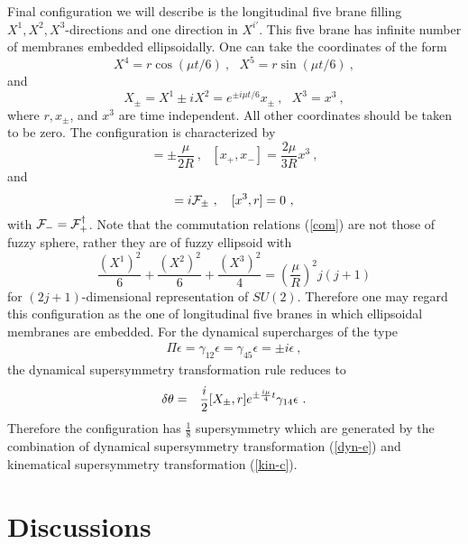 \documentclass[a4paper,12pt]{article}
\begin{document}
Final configuration we will describe is the longitudinal five
brane filling $X^1, X^2, X^3$-directions and one direction in
$X^{i'}$. This five brane has infinite number of membranes
embedded ellipsoidally. One can take the coordinates of the form
\begin{equation}
X^{4}=r \cos(\mu t/6)~, \ \ \ X^{5}=r \sin(\mu t/6)~,
\end{equation}
and
\begin{equation}
X_{\pm} = X^1\pm i X^2 = e^{\pm i\mu t/6} x_{\pm}~,\ \ \ X^3 =
x^3~,
\end{equation}
where $r, x_{\pm}$, and $x^3$ are time independent. All other
coordinates should be taken to be zero. The configuration is
characterized by
\begin{equation}
[x^3, x_{\pm} ] = \pm \frac{\mu}{2 R}~, \ \ \ [x_+, x_-]=
\frac{2\mu}{3R} x^3~, \label{com}
\end{equation}
and
\begin{equation}
[x_\pm, r ] = i {\cal F}_{\pm}~, \ \ \
[x^3, r]= 0~,
\end{equation}
with ${\cal F}_- = {\cal F}_+^\dagger$. Note that the commutation
relations (\ref{com}) are not those of fuzzy sphere, rather they
are of fuzzy ellipsoid with
\begin{equation}
\frac{(X^1)^2}{6}+\frac{(X^2)^2}{6}+\frac{(X^3)^2}{4}=(\frac{\mu}{R})^2
j(j+1)
\end{equation}
for $(2j+1)$-dimensional representation of $SU(2)$. Therefore one
may regard this configuration as the one of longitudinal five
branes in which ellipsoidal membranes are embedded. For the
dynamical supercharges of the type
\begin{eqnarray}
\Pi \epsilon=  \gamma_{12}\epsilon =  \gamma_{45}\epsilon = \pm
i\epsilon~,
\end{eqnarray}
the dynamical supersymmetry transformation rule reduces to
\begin{eqnarray}
\delta\theta &=& \frac{i}{2} [ X_{\pm}, r]
 e^{\pm{i\mu \over 4} t}\gamma_{14}\epsilon~.
 \label{dyn-e}
\end{eqnarray}
Therefore the configuration has $\frac{1}{8}$ supersymmetry which
are generated by the combination of dynamical supersymmetry
transformation (\ref{dyn-e}) and kinematical supersymmetry
transformation (\ref{kin-c}).


\section{Discussions}
\label{conc}
\end{document}
